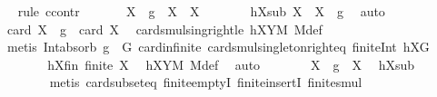 \begin{isabellebody}
\ \ \isamarkupfalse%
{\isacharparenleft}{\kern0pt}rule\ ccontr{\isacharparenright}{\kern0pt}\isanewline
\ \ \ \ \isamarkupfalse%
\ {\isachardoublequoteopen}{\isasymnot}\ {\isacharparenleft}{\kern0pt}X\ {\isasymcdots}\ {\isacharbraceleft}{\kern0pt}g{\isacharbraceright}{\kern0pt}{\isacharparenright}{\kern0pt}\ {\isasyminter}\ X\ {\isasymsubset}\ X{\isachardoublequoteclose}\isanewline
\ \ \ \ \isamarkupfalse%
\ \isamarkupfalse%
\ hXsub{\isacharcolon}{\kern0pt}\ {\isachardoublequoteopen}X\ {\isasymsubseteq}\ X\ {\isasymcdots}\ {\isacharbraceleft}{\kern0pt}g{\isacharbraceright}{\kern0pt}{\isachardoublequoteclose}\ \isamarkupfalse%
\ auto\isanewline
\ \ \ \ \isamarkupfalse%
\ \isamarkupfalse%
\ {\isachardoublequoteopen}card\ X\ {\isasymcdots}\ {\isacharbraceleft}{\kern0pt}g{\isacharbraceright}{\kern0pt}\ {\isacharequal}{\kern0pt}\ card\ X{\isachardoublequoteclose}\ \isamarkupfalse%
\ card{\isacharunderscore}{\kern0pt}smul{\isacharunderscore}{\kern0pt}sing{\isacharunderscore}{\kern0pt}right{\isacharunderscore}{\kern0pt}le\ hXYM\ M{\isacharunderscore}{\kern0pt}def\isanewline
\ \ \ \ \ \ \isamarkupfalse%
\ {\isacharparenleft}{\kern0pt}metis\ Int{\isacharunderscore}{\kern0pt}absorb{}\ {\isacartoucheopen}g\ {\isasymin}\ G{\isacartoucheclose}\ card{\isachardot}{\kern0pt}infinite\ card{\isacharunderscore}{\kern0pt}smul{\isacharunderscore}{\kern0pt}singleton{\isacharunderscore}{\kern0pt}right{\isacharunderscore}{\kern0pt}eq\ finite{\isacharunderscore}{\kern0pt}Int\ hXG{\isacharparenright}{\kern0pt}\isanewline
\ \ \ \ \isamarkupfalse%
\ \isamarkupfalse%
\ hXfin{\isacharcolon}{\kern0pt}\ {\isachardoublequoteopen}finite\ X{\isachardoublequoteclose}\ \isamarkupfalse%
\ hXYM\ M{\isacharunderscore}{\kern0pt}def\ \isamarkupfalse%
\ auto\isanewline
\ \ \ \ \isamarkupfalse%
\ \isamarkupfalse%
\ {\isachardoublequoteopen}X\ {\isasymcdots}\ {\isacharbraceleft}{\kern0pt}g{\isacharbraceright}{\kern0pt}\ {\isacharequal}{\kern0pt}\ X{\isachardoublequoteclose}\ \isamarkupfalse%
\ hXsub\ \isanewline
\ \ \ \ \ \ \isamarkupfalse%
\ {\isacharparenleft}{\kern0pt}metis\ card{\isacharunderscore}{\kern0pt}subset{\isacharunderscore}{\kern0pt}eq\ finite{\isachardot}{\kern0pt}emptyI\ finite{\isachardot}{\kern0pt}insertI\ finite{\isacharunderscore}{\kern0pt}smul{\isacharparenright}{\kern0pt}\isanewline

\end{isabellebody}
